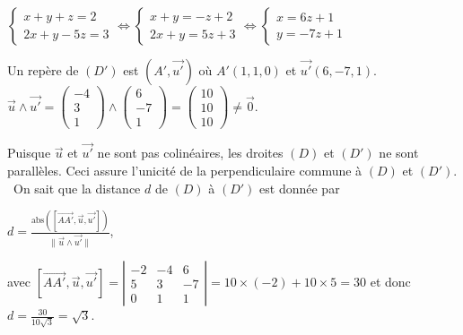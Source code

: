 {{\begin{center}
$\left\{
\begin{array}{l}
x+y+z=2\\
2x+y-5z=3
\end{array}
\right.\Leftrightarrow\left\{
\begin{array}{l}
x+y=-z+2\\
2x+y=5z+3
\end{array}
\right.\Leftrightarrow\left\{
\begin{array}{l}
x=6z+1\\
y=-7z+1
\end{array}
\right.$
\end{center}
Un repère de $(D')$ est $\left(A',\overrightarrow{u'}\right)$ où $A'(1,1,0)$ et $\overrightarrow{u'}(6,-7,1)$.
\textbullet~$\overrightarrow{u}\wedge\overrightarrow{u'}=\left(
\begin{array}{c}
-4\\
3\\
1
\end{array}
\right)\wedge\left(
\begin{array}{c}
6\\
-7\\
1
\end{array}
\right)=\left(
\begin{array}{c}
10\\
10\\
10
\end{array}
\right)\neq\overrightarrow{0}$.
\rule{0mm}{5mm}Puisque $\overrightarrow{u}$ et $\overrightarrow{u'}$ ne sont pas colinéaires, les droites $(D)$ et $(D')$ ne sont parallèles. Ceci assure l'unicité de la perpendiculaire commune  à $(D)$ et $(D')$.
\textbullet~On sait que la distance $d$ de $(D)$ à $(D')$ est donnée par

\begin{center}
$d=\frac{\text{abs}\left(\left[\overrightarrow{AA'},\overrightarrow{u},\overrightarrow{u'}\right]\right)}{\|\overrightarrow{u}\wedge\overrightarrow{u'}\|}$,
\end{center}
avec $[\overrightarrow{AA'},\overrightarrow{u},\overrightarrow{u'}]=\left|
\begin{array}{ccc}
-2&-4&6\\
5&3&-7\\
0&1&1
\end{array}
\right|=10\times(-2)+10\times5=30$ et donc $d=\frac{30}{10\sqrt{3}}=\sqrt{3}$.

\begin{center}
\end{center}

}}

